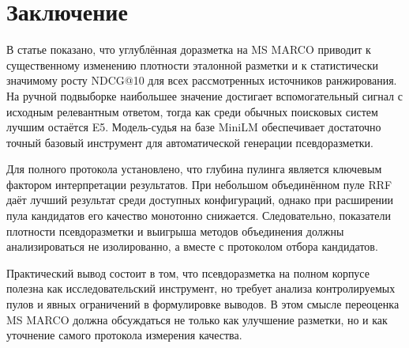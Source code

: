 \documentclass[runningheads,a4paper]{llncs}
\begin{document}
\section{Заключение}

В статье показано, что углублённая доразметка на MS MARCO приводит к существенному изменению плотности эталонной разметки и к статистически значимому росту NDCG@10 для всех рассмотренных источников ранжирования. На ручной подвыборке наибольшее значение достигает вспомогательный сигнал с исходным релевантным ответом, тогда как среди обычных поисковых систем лучшим остаётся E5. Модель-судья на базе MiniLM обеспечивает достаточно точный базовый инструмент для автоматической генерации псевдоразметки.

Для полного протокола установлено, что глубина пулинга является ключевым фактором интерпретации результатов. При небольшом объединённом пуле RRF даёт лучший результат среди доступных конфигураций, однако при расширении пула кандидатов его качество монотонно снижается. Следовательно, показатели плотности псевдоразметки и выигрыша методов объединения должны анализироваться не изолированно, а вместе с протоколом отбора кандидатов.

Практический вывод состоит в том, что псевдоразметка на полном корпусе полезна как исследовательский инструмент, но требует анализа контролируемых пулов и явных ограничений в формулировке выводов. В этом смысле переоценка MS MARCO должна обсуждаться не только как улучшение разметки, но и как уточнение самого протокола измерения качества.
\end{document}

